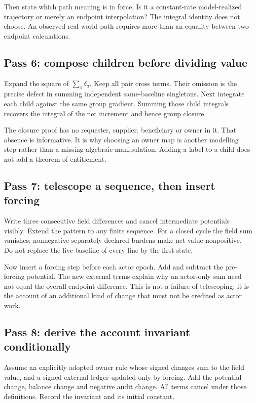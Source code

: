 Then state which path meaning is in force. Is it a constant-rate
model-realized trajectory or merely an endpoint interpolation? The
integral identity does not choose. An observed real-world path requires
more than an equality between two endpoint calculations.

\subsection{Pass 6: compose children before dividing value}
Expand the square of $\sum_a\delta_a$. Keep all pair cross
terms. Their omission is the precise defect in summing independent
same-baseline singletons. Next integrate each child against the same
group gradient. Summing those child integrals recovers the integral
of the net increment and hence group closure.

The closure proof has no requester, supplier, beneficiary or owner in
it. That absence is informative. It is why choosing an owner map is
another modelling step rather than a missing algebraic manipulation.
Adding a label to a child does not add a theorem of entitlement.

\subsection{Pass 7: telescope a sequence, then insert forcing}
Write three consecutive field differences and cancel intermediate
potentials visibly. Extend the pattern to any finite sequence. For
a closed cycle the field sum vanishes; nonnegative separately declared
burdens make net value nonpositive. Do not replace the live baseline
of every line by the first state.

Now insert a forcing step before each actor epoch. Add and subtract
the pre-forcing potential. The new external terms explain why an
actor-only sum need not equal the overall endpoint difference. This
is not a failure of telescoping; it is the account of an additional
kind of change that must not be credited as actor work.

\subsection{Pass 8: derive the account invariant conditionally}
Assume an explicitly adopted owner rule whose signed changes sum to
the field value, and a signed external ledger updated only by forcing.
Add the potential change, balance change and negative audit change.
All terms cancel under those definitions. Record the invariant and
its initial constant.


